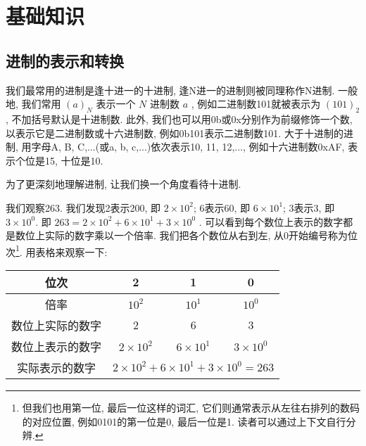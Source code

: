 \chapter{基础知识} \label{基础知识}
\fancyhead[LO]{\bfseries\leftmark}
\fancyhead[RE]{\bfseries\rightmark}
    
    \section{进制的表示和转换} \label{进制的表示与转换}
        我们最常用的进制是逢十进一的十进制, 逢N进一的进制则被同理称作N进制. 一般地, 我们常用 $ (a)_N $ 表示一个 $ N $ 进制数 $ a $ , 例如二进制数101就被表示为 $ (101)_2 $ , 不加括号默认是十进制数. 此外, 我们也可以用0b或0x分别作为前缀修饰一个数, 以表示它是二进制数或十六进制数, 例如0b101表示二进制数101. 大于十进制的进制, 用字母A, B, C,...(或a, b, c,...)依次表示10, 11, 12,..., 例如十六进制数0xAF, 表示个位是15, 十位是10.

        为了更深刻地理解进制, 让我们换一个角度看待十进制.

        我们观察263. 我们发现2表示200, 即 $ 2 \times 10 ^ 2 $; 6表示60, 即 $ 6 \times 10 ^ 1 $; 3表示3, 即 $ 3 \times 10 ^ 0 $. 即 $ 263 = 2 \times 10 ^ 2 + 6 \times 10 ^ 1 + 3 \times 10 ^ 0 $ . 可以看到每个数位上表示的数字都是数位上实际的数字乘以一个倍率. 我们把各个数位从右到左, 从0开始编号称为位次\footnote{但我们也用第一位, 最后一位这样的词汇, 它们则通常表示从左往右排列的数码的对应位置, 例如0101的第一位是0, 最后一位是1. 读者可以通过上下文自行分辨.}. 用表格来观察一下:
        \begin{center}
            \begin{tabular}{|c|c|c|c|}
                \hline
                位次                & 2                     & 1                     & 0                     \\
                \hline
                倍率                & $ 10 ^ 2 $            & $ 10 ^ 1 $            & $ 10 ^ 0 $            \\
                \hline
                数位上实际的数字     & 2                     & 6                     & 3                     \\
                \hline
                数位上表示的数字     & $ 2 \times 10 ^ 2 $   & $ 6 \times 10 ^ 1 $   & $ 3 \times 10 ^ 0 $   \\
                \hline
                实际表示的数字       & \multicolumn{3}{|c|}{ $ 2 \times 10 ^ 2 + 6 \times 10 ^ 1 + 3 \times 10 ^ 0 = 263 $ }\\
                \hline
            \end{tabular}
        \end{center}

